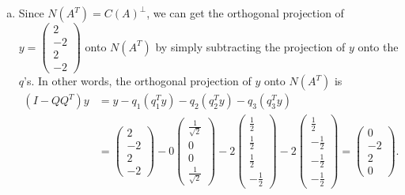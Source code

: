 \documentclass[12pt]{article}
\begin{document}
\begin{enumerate}[1.]
\begin{enumerate}[(a)]
        \item Since $N(A^T) = C(A)^{\perp}$, we can get the orthogonal projection of $y = \begin{pmatrix} 2 \\ -2 \\ 2 \\ -2 \end{pmatrix}$ onto $N(A^T)$ by simply subtracting the projection of $y$ onto the $q$'s. In other words, the orthogonal projection of $y$ onto $N(A^T)$ is
        \begin{align*}
        (I- QQ^T) y &= y -  q_1 (q_1^T y) -  q_2(q_2^T y) -q_3 (q_3^T y)  \\
        &=  \begin{pmatrix} 2 \\ -2 \\ 2 \\ -2 \end{pmatrix} -0\begin{pmatrix} \frac{1}{\sqrt{2}} \\ 0 \\ 0 \\ \frac{1}{\sqrt{2}} \end{pmatrix} - 2\begin{pmatrix} \frac{1}{2} \\ \frac{1}{2} \\ \frac{1}{2} \\ -\frac{1}{2} \end{pmatrix} - 2\begin{pmatrix} \frac{1}{2} \\ -\frac{1}{2} \\ -\frac{1}{2} \\ -\frac{1}{2} \end{pmatrix} = \boxed{\begin{pmatrix} 0 \\ -2 \\ 2 \\ 0 \end{pmatrix}}.
        \end{align*}

\end{enumerate}
\end{enumerate}
\end{document}
